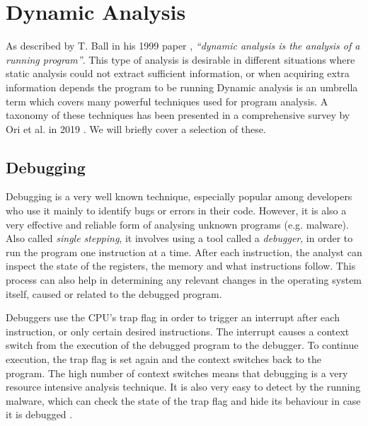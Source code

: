 \section{Dynamic Analysis}

As described by T. Ball in his 1999 paper \cite{concept_of_da_1999}, \emph{``dynamic analysis is the analysis of a running program''}. This type of analysis is desirable in different situations where static analysis could not extract sufficient information, or when acquiring extra information depends the program to be running %
Dynamic analysis is an umbrella term which covers many powerful techniques used for program analysis. A taxonomy of these techniques has been presented in a comprehensive survey by Ori et al. in 2019 \cite{da_survey_2019}. We will briefly cover a selection of these.

\subsection{Debugging}


Debugging is a very well known technique, especially popular among developers who use it mainly to identify bugs or errors in their code. However, it is also a very effective and reliable form of analysing unknown programs (e.g. malware). Also called \emph{single stepping}, it involves using a tool called a \emph{debugger}, in order to run the program one instruction at a time. After each instruction, the analyst can inspect the state of the registers, the memory and what instructions follow. This process can also help in determining any relevant changes in the operating system itself, caused or related to the debugged program.

Debuggers use the CPU's trap flag in order to trigger an interrupt after each instruction, or only certain desired instructions. The interrupt causes a context switch from the execution of the debugged program to the debugger. To continue execution, the trap flag is set again and the context switches back to the program. The high number of context switches means that debugging is a very resource intensive analysis technique. It is also very easy to detect by the running malware, which can check the state of the trap flag and hide its behaviour in case it is debugged \cite{da_survey_2019}.

